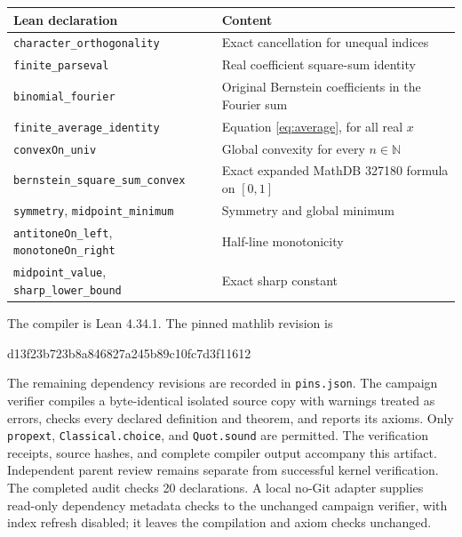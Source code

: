 \documentclass[11pt]{article}
\newcommand{\N}{\mathbb N}
\begin{document}
\begin{center}
\small
\begin{tabular}{@{}p{}p{}@{}}
\toprule
Lean declaration & Content \\
\midrule
\texttt{character\_orthogonality} & Exact cancellation for unequal indices \\
\texttt{finite\_parseval} & Real coefficient square-sum identity \\
\texttt{binomial\_fourier} & Original Bernstein coefficients in the Fourier sum \\
\texttt{finite\_average\_identity} & Equation \eqref{eq:average}, for all real $x$ \\
\texttt{convexOn\_univ} & Global convexity for every $n\in\N$ \\
\texttt{bernstein\_square\_sum\_convex} & Exact expanded MathDB 327180 formula on $[0,1]$ \\
\texttt{symmetry}, \texttt{midpoint\_minimum} & Symmetry and global minimum \\
\texttt{antitoneOn\_left}, \texttt{monotoneOn\_right} & Half-line monotonicity \\
\texttt{midpoint\_value}, \texttt{sharp\_lower\_bound} & Exact sharp constant \\
\bottomrule
\end{tabular}
\end{center}

The compiler is Lean 4.34.1. The pinned mathlib revision is
\begin{center}\small\ttfamily
d13f23b723b8a846827a245b89c10fc7d3f11612
\end{center}
The remaining dependency revisions are recorded in \texttt{pins.json}.
The campaign verifier compiles
a byte-identical isolated source copy with warnings treated as errors,
checks every declared definition and theorem, and reports its axioms.
Only \texttt{propext}, \texttt{Classical.choice}, and \texttt{Quot.sound}
are permitted. The verification receipts, source hashes, and complete
compiler output accompany this artifact. Independent parent review remains
separate from successful kernel verification. The completed audit checks
20 declarations. A local no-Git adapter supplies read-only dependency
metadata checks to the unchanged campaign verifier, with index refresh
disabled; it leaves the compilation and axiom checks unchanged.
\end{document}
